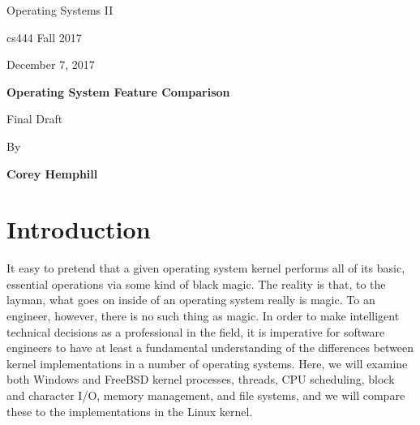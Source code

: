 \documentclass[onecolumn, draftclsnofoot,10pt, compsoc]{IEEEtran}
\def \Author{Corey Hemphill}
\def \Title{Operating System Feature Comparison}
\def \Subtitle{Final Draft}
\def \Term{cs444 Fall 2017}
\def \DueDate{December 7, 2017}
\def \DocType {
	Operating Systems II
}
\begin{document}
\begin{titlepage}
    \begin{singlespace}
        \hfill  
        \par\vspace{.2in}
        \centering
        \scshape{
            \huge  \DocType \par
           	\huge \Term \par
            {\large \DueDate}\par
            \vspace{.5in}
            \textbf{\Huge \Title}\par
            {\large \Subtitle}\par
            \vspace{.5in}
            {\large By }\par
           	\textbf{\Author}\par
            \vspace{5pt}
            }
            \vspace{120pt}
        
        \begin{abstract}
        This document examines, compares, and contrasts attributes of a number of low-level operating system kernel features such as processes, threads, CPU scheduling, IO management, memory management, and file systems. The following sections of this document discusses several key components of Windows and FreeBSD operating system kernels, and compares these features with those of the Linux operating system kernel. The purpose of this document is to evaluate why certain modern-day operating system features are implemented the way they are. For some of these features, similar approaches are used by many operating systems, and for others, implementations can vary widely for a number of different reasons.
        \end{abstract} 
        
    \end{singlespace}
\end{titlepage}
\newpage
{}
\tableofcontents

\newpage
\section{Introduction}
\noindent It easy to pretend that a given operating system kernel performs all of its basic, essential operations via some kind of black magic. The reality is that, to the layman, what goes on inside of an operating system really is magic. To an engineer, however, there is no such thing as magic. In order to make intelligent technical decisions as a professional in the field, it is imperative for software engineers to have at least a fundamental understanding of the differences between kernel implementations in a number of operating systems. Here, we will examine both Windows and FreeBSD kernel processes, threads, CPU scheduling, block and character I/O, memory management, and file systems, and we will compare these to the implementations in the Linux kernel.
\end{document}
